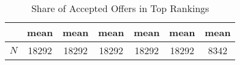 \begin{table}[htbp]\centering
\def\sym#1{\ifmmode^{#1}\else\(^{#1}\)\fi}
\caption{Share of Accepted Offers in Top Rankings}
\begin{tabular}{l*{6}{c}}
\hline\hline
            &        mean&        mean&        mean&        mean&        mean&        mean\\
\hline
\hline
\(N\)       &       18292&       18292&       18292&       18292&       18292&        8342\\
\hline\hline
\end{tabular}
\end{table}
